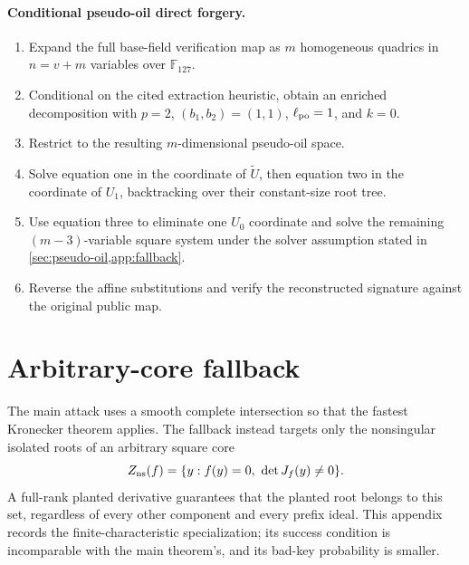 \documentclass[10pt,a4paper]{article}
\newcommand{\F}{\mathbb F}
\begin{document}
\paragraph{Conditional pseudo-oil direct forgery.}
\begin{enumerate}
\item Expand the full base-field verification map as $m$ homogeneous quadrics in $n=v+m$ variables over $\F_{127}$.
\item Conditional on the cited extraction heuristic, obtain an enriched decomposition with $p=2$, $(b_1,b_2)=(1,1)$, $\ell_{\rm po}=1$, and $k=0$.
\item Restrict to the resulting $m$-dimensional pseudo-oil space.
\item Solve equation one in the coordinate of $\widetilde U$, then equation two in the coordinate of $U_1$, backtracking over their constant-size root tree.
\item Use equation three to eliminate one $U_0$ coordinate and solve the remaining $(m-3)$-variable square system under the solver assumption stated in \cref{sec:pseudo-oil,app:fallback}.
\item Reverse the affine substitutions and verify the reconstructed signature against the original public map.
\end{enumerate}

\section{Arbitrary-core fallback}\label{app:fallback}

\begin{center}
\end{center}

The main attack uses a smooth complete intersection so that the fastest Kronecker theorem applies.  The fallback instead targets only the nonsingular isolated roots of an arbitrary square core
\[
Z_{\rm ns}(f)=\{y:f(y)=0,\ \det J_f(y)\ne0\}.
\]
A full-rank planted derivative guarantees that the planted root belongs to this set, regardless of every other component and every prefix ideal.  This appendix records the finite-characteristic specialization; its success condition is incomparable with the main theorem's, and its bad-key probability is smaller.
\end{document}
